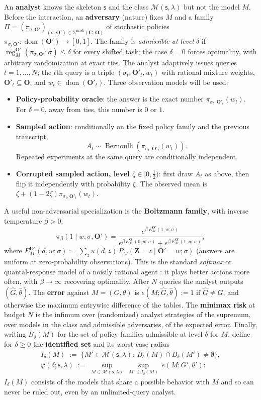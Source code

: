 \documentclass[11pt]{amsart}
\theoremstyle{plain}
\theoremstyle{definition}
\DeclareMathOperator{\dom}{dom}
\DeclareMathOperator{\reg}{reg}
\newcommand{\bC}{\mathbf{C}}
\newcommand{\bO}{\mathbf{O}}
\newcommand{\bZ}{\mathbf{Z}}
\newcommand{\MM}{\mathcal{M}}
\newcommand{\sk}{\mathsf{s}}
\begin{document}
An \textbf{analyst} knows the skeleton $\sk$ and the class $\MM(\sk,\lambda)$ but not the model $M$. Before the interaction, an \textbf{adversary} (nature) fixes $M$ and a family $\Pi=(\pi_{\sigma,\bO'})_{(\sigma,\bO')\in\Sigma^\mathrm{mask}(\bC,\bO)}$ of stochastic policies $\pi_{\sigma,\bO'}\colon\dom(\bO')\to[0,1]$. The family is \emph{admissible at level $\delta$} if $\reg_M^{\bO'}(\pi_{\sigma,\bO'};\sigma)\le\delta$ for every shifted task; the case $\delta=0$ forces optimality, with arbitrary randomization at exact ties. The analyst adaptively issues queries $t=1,\dots,N$; the $t$th query is a triple $(\sigma_t,\bO'_t,w_t)$ with rational mixture weights, $\bO'_t\subseteq\bO$, and $w_t\in\dom(\bO'_t)$. Three observation models will be used:
\begin{itemize}
\item \textbf{Policy-probability oracle}: the answer is the exact number $\pi_{\sigma_t,\bO'_t}(w_t)$. For $\delta=0$, away from ties, this number is $0$ or $1$.
\item \textbf{Sampled action}: conditionally on the fixed policy family and the previous transcript,
\[
   A_t\sim\operatorname{Bernoulli}\!\left(\pi_{\sigma_t,\bO'_t}(w_t)\right).
\]
Repeated experiments at the same query are conditionally independent.
\item \textbf{Corrupted sampled action, level $\zeta\in[0,\tfrac12)$}: first draw $A_t$ as above, then flip it independently with probability $\zeta$. The observed mean is $\zeta+(1-2\zeta)\pi_{\sigma_t,\bO'_t}(w_t)$.
\end{itemize}
A useful non-adversarial specialization is the \textbf{Boltzmann family}, with inverse temperature $\beta>0$:
\[
\pi_\beta(1\mid w;\sigma,\bO')=\frac{e^{\beta\,E_M^{\bO'}(1,w;\sigma)}}{e^{\beta\,E_M^{\bO'}(0,w;\sigma)}+e^{\beta\,E_M^{\bO'}(1,w;\sigma)}},
\]
where $E_M^{\bO'}(d,w;\sigma):=\sum_z u(d,z)\,P_M(\bZ=z\mid \bO'=w;\sigma)$ (answers are uniform at zero-probability observations). This is the standard \emph{softmax} or quantal-response model of a noisily rational agent \cite{mckelvey1995}: it plays better actions more often, with $\beta\to\infty$ recovering optimality.
After $N$ queries the analyst outputs $(\widehat G,\widehat\theta)$. The \textbf{error} against $M=(G,\theta)$ is $e(M;\widehat G,\widehat\theta):=1$ if $\widehat G\neq G$, and otherwise the maximum entrywise difference of the tables. The \textbf{minimax risk} at budget $N$ is the infimum over (randomized) analyst strategies of the supremum, over models in the class and admissible adversaries, of the expected error. Finally, writing $B_\delta(M)$ for the set of policy families admissible at level $\delta$ for $M$, define for $\delta\ge0$ the \textbf{identified set} and its worst-case radius
\begin{gather*}
   I_\delta(M)\;:=\;\bigl\{M'\in\MM(\sk,\lambda):\ B_\delta(M)\cap B_\delta(M')\neq\emptyset\bigr\},\\
   \varphi(\delta;\sk,\lambda)\;:=\;\sup_{M\in\MM(\sk,\lambda)}\ \sup_{M'\in I_\delta(M)}\,e(M;G',\theta'):
\end{gather*}
$I_\delta(M)$ consists of the models that share a possible behavior with $M$ and so can never be ruled out, even by an unlimited-query analyst.
\end{document}
